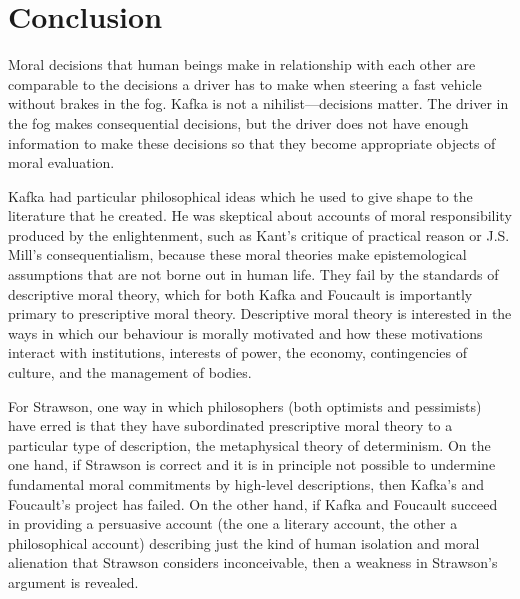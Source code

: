\documentclass[11pt]{article}
\begin{document}
\section{Conclusion}
\label{section:conclusion}

Moral decisions that human beings make in relationship with each other
are comparable to the decisions a driver has to make when steering a
fast vehicle without brakes in the fog. Kafka is not a
nihilist---decisions matter. The driver in the fog makes consequential
decisions, but the driver does not have enough information to make
these decisions so that they become appropriate objects of moral
evaluation.

Kafka had particular philosophical ideas which he used to give shape
to the literature that he created. He was skeptical about accounts of
moral responsibility produced by the enlightenment, such as Kant's
critique of practical reason or J.S. Mill's consequentialism, because
these moral theories make epistemological assumptions that are not
borne out in human life. They fail by the standards of descriptive
moral theory, which for both Kafka and Foucault is importantly primary
to prescriptive moral theory. Descriptive moral theory is interested
in the ways in which our behaviour is morally motivated and how these
motivations interact with institutions, interests of power, the
economy, contingencies of culture, and the management of bodies.

For Strawson, one way in which philosophers (both optimists and
pessimists) have erred is that they have subordinated prescriptive
moral theory to a particular type of description, the metaphysical
theory of determinism. On the one hand, if Strawson is correct and
it is in principle not possible to undermine fundamental moral
commitments by high-level descriptions, then Kafka's and
Foucault's project has failed. On the other hand, if Kafka and
Foucault succeed in providing a persuasive account (the one a
literary account, the other a philosophical account) describing
just the kind of human isolation and moral alienation that
Strawson considers inconceivable, then a weakness in Strawson's
argument is revealed.




\end{document}
